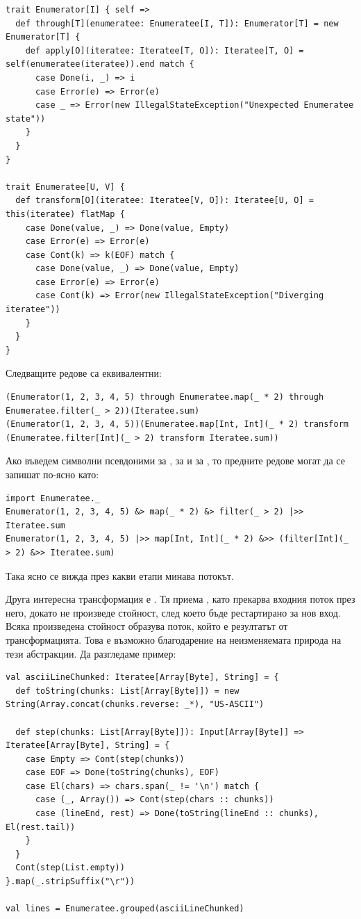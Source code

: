 \begin{lstlisting}
trait Enumerator[I] { self =>
  def through[T](enumeratee: Enumeratee[I, T]): Enumerator[T] = new Enumerator[T] {
    def apply[O](iteratee: Iteratee[T, O]): Iteratee[T, O] = self(enumeratee(iteratee)).end match {
      case Done(i, _) => i
      case Error(e) => Error(e)
      case _ => Error(new IllegalStateException("Unexpected Enumeratee state"))
    }
  }
}

trait Enumeratee[U, V] {
  def transform[O](iteratee: Iteratee[V, O]): Iteratee[U, O] = this(iteratee) flatMap {
    case Done(value, _) => Done(value, Empty)
    case Error(e) => Error(e)
    case Cont(k) => k(EOF) match {
      case Done(value, _) => Done(value, Empty)
      case Error(e) => Error(e)
      case Cont(k) => Error(new IllegalStateException("Diverging iteratee"))
    }
  }
}
\end{lstlisting}

Следващите редове са еквивалентни:

\begin{lstlisting}
(Enumerator(1, 2, 3, 4, 5) through Enumeratee.map(_ * 2) through Enumeratee.filter(_ > 2))(Iteratee.sum)
(Enumerator(1, 2, 3, 4, 5))(Enumeratee.map[Int, Int](_ * 2) transform (Enumeratee.filter[Int](_ > 2) transform Iteratee.sum))
\end{lstlisting}

Ако въведем символни псевдоними \code{|>>} за , \code{&>} за  и \code{&>>} за , то предните редове могат да се запишат по-ясно като:

\begin{lstlisting}
import Enumeratee._
Enumerator(1, 2, 3, 4, 5) &> map(_ * 2) &> filter(_ > 2) |>> Iteratee.sum
Enumerator(1, 2, 3, 4, 5) |>> map[Int, Int](_ * 2) &>> (filter[Int](_ > 2) &>> Iteratee.sum)
\end{lstlisting}

Така ясно се вижда през какви етапи минава потокът.

Друга интересна трансформация е . Тя приема , като прекарва входния поток през него, докато не произведе стойност, след което бъде рестартирано за нов вход. Всяка произведена стойност образува поток, който е резултатът от трансформацията. Това е възможно благодарение на неизменяемата природа на тези абстракции. Да разгледаме пример:

\begin{lstlisting}
val asciiLineChunked: Iteratee[Array[Byte], String] = {
  def toString(chunks: List[Array[Byte]]) = new String(Array.concat(chunks.reverse: _*), "US-ASCII")
  
  def step(chunks: List[Array[Byte]]): Input[Array[Byte]] => Iteratee[Array[Byte], String] = {
    case Empty => Cont(step(chunks))
    case EOF => Done(toString(chunks), EOF)
    case El(chars) => chars.span(_ != '\n') match {
      case (_, Array()) => Cont(step(chars :: chunks))
      case (lineEnd, rest) => Done(toString(lineEnd :: chunks), El(rest.tail))
    }
  }
  Cont(step(List.empty))
}.map(_.stripSuffix("\r"))

val lines = Enumeratee.grouped(asciiLineChunked)
\end{lstlisting}

